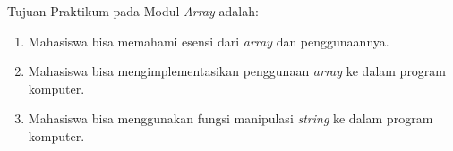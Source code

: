 \documentclass{subfiles}
\begin{document}
    \noindent Tujuan Praktikum pada Modul {\thechapter} \textit{Array} adalah:
    \begin{enumerate}
        \item Mahasiswa bisa memahami esensi dari \textit{array} dan penggunaannya.
        \item Mahasiswa bisa mengimplementasikan penggunaan \textit{array} ke dalam program komputer.
        \item Mahasiswa bisa menggunakan fungsi manipulasi \textit{string} ke dalam program komputer. 
    \end{enumerate}
\end{document}
